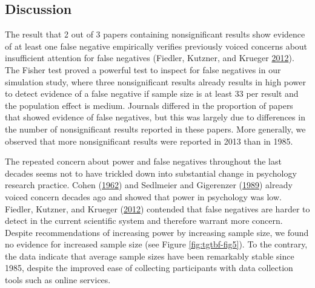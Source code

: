 \documentclass[a5paper]{book}
\begin{document}
\subsection{Discussion}\label{discussion-1}

The result that 2 out of 3 papers containing nonsignificant results show
evidence of at least one false negative empirically verifies previously
voiced concerns about insufficient attention for false negatives
(Fiedler, Kutzner, and Krueger
\protect\hyperlink{ref-doi:10.1177ux2f1745691612462587}{2012}). The
Fisher test proved a powerful test to inspect for false negatives in our
simulation study, where three nonsignificant results already results in
high power to detect evidence of a false negative if sample size is at
least 33 per result and the population effect is medium. Journals
differed in the proportion of papers that showed evidence of false
negatives, but this was largely due to differences in the number of
nonsignificant results reported in these papers. More generally, we
observed that more nonsignificant results were reported in 2013 than in
1985.

The repeated concern about power and false negatives throughout the last
decades seems not to have trickled down into substantial change in
psychology research practice. Cohen
(\protect\hyperlink{ref-doi:10.1037ux2fh0045186}{1962}) and Sedlmeier
and Gigerenzer
(\protect\hyperlink{ref-doi:10.1037ux2f0033-2909.105.2.309}{1989})
already voiced concern decades ago and showed that power in psychology
was low. Fiedler, Kutzner, and Krueger
(\protect\hyperlink{ref-doi:10.1177ux2f1745691612462587}{2012})
contended that false negatives are harder to detect in the current
scientific system and therefore warrant more concern. Despite
recommendations of increasing power by increasing sample size, we found
no evidence for increased sample size (see Figure \ref{fig:tgtbf-fig5}).
To the contrary, the data indicate that average sample sizes have been
remarkably stable since 1985, despite the improved ease of collecting
participants with data collection tools such as online services.
\end{document}
